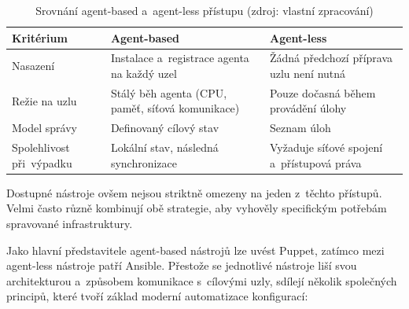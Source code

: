 \renewcommand{\arraystretch}{1.5}
\begin{table}[h]
\centering
\begin{tabular}{|
>{\raggedright\arraybackslash}p{3.5cm}|
>{\raggedright\arraybackslash}p{5.5cm}|
>{\raggedright\arraybackslash}p{5.5cm}|}
\hline
\textbf{Kritérium} & \textbf{Agent-based} & \textbf{Agent-less} \\
\hline
Nasazení & Instalace a~registrace agenta na každý uzel & Žádná předchozí příprava uzlu není nutná \\
\hline
Režie na uzlu & Stálý běh agenta (CPU, paměť, síťová komunikace) & Pouze dočasná během provádění úlohy \\
\hline
Model správy & Definovaný cílový stav & Seznam úloh \\
\hline
Spolehlivost při~výpadku & Lokální stav, následná synchronizace & Vyžaduje síťové spojení a~přístupová práva \\
\hline
\end{tabular}
\renewcommand{\arraystretch}{1}
\caption{Srovnání agent-based a~agent-less přístupu (zdroj: vlastní zpracování)}
\label{tab:agent}
\end{table}

Dostupné nástroje ovšem nejsou striktně omezeny na jeden z~těchto přístupů.
Velmi často různě kombinují obě strategie, aby vyhověly specifickým potřebám spravované infrastruktury.

Jako hlavní představitele agent-based nástrojů lze uvést Puppet, zatímco mezi agent-less nástroje patří Ansible.
Přestože se jednotlivé nástroje liší svou architekturou a~způsobem komunikace s~cílovými uzly, sdílejí několik společných principů, které tvoří základ moderní automatizace konfigurací:

